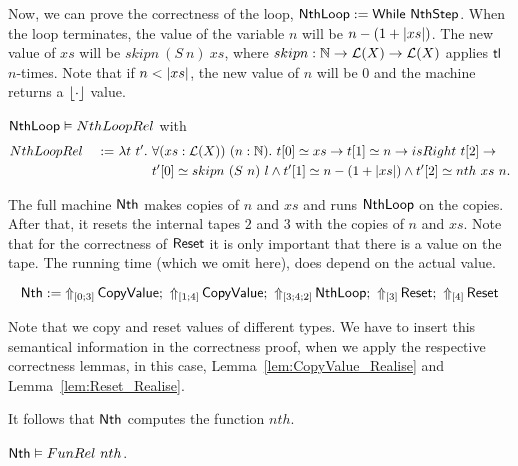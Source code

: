 Now, we can prove the correctness of the loop, $\MS{NthLoop} := \While~\MS{NthStep}$.  When the loop terminates, the value of the variable $n$ will be
$n - (1 + \length{xs})$.  The new value of $xs$ will be $skipn~(S~n)~xs$, where $skipn : \Nat \to \List(X) \to \List(X)$ applies $\tl$ $n$-times.  Note
that if $n < \length{xs}$, the new value of $n$ will be $0$ and the machine returns a $\Some\cdot$ value.

\begin{lemma}
  \label{lem:Nth_Loop_Realise}
  $\MS{NthLoop} \Realise NthLoopRel$ with
  \begin{alignat*}{2}
    & NthLoopRel &~:=~& \lambda t~t'.~\forall (xs:\List(X))~(n:\Nat).~t[0] \simeq xs \rightarrow t[1] \simeq n \rightarrow isRight~t[2] \rightarrow \\
    &            &~  ~& \phantom{\lambda t~t'.}~t'[0] \simeq skipn~(S~n)~l \land t'[1] \simeq n-(1+\length{xs}) \land t'[2] \simeq nth~xs~n.
  \end{alignat*}
\end{lemma}

The full machine $\MS{Nth}$ makes copies of $n$ and $xs$ and runs $\MS{NthLoop}$ on the copies.  After that, it resets the internal tapes $2$ and $3$
with the copies of $n$ and $xs$.  Note that for the correctness of $\MS{Reset}$ it is only important that there is a value on the tape.  The running time
(which we omit here), does depend on the actual value.
\begin{definition}[$\MS{Nth}$][Nth]
  \[
    \MS{Nth} := \LiftTapes{\MS{CopyValue}}{\Vector{0;3}} \Seq
    \LiftTapes{\MS{CopyValue}}{\Vector{1;4}} \Seq
    \LiftTapes{\MS{NthLoop}}{\Vector{3;4;2}} \Seq
    \LiftTapes{\MS{Reset}}{\Vector{3}} \Seq
    \LiftTapes{\MS{Reset}}{\Vector{4}}
  \]
\end{definition}
Note that we copy and reset values of different types.  We have to insert this semantical information in the correctness proof, when we apply the
respective correctness lemmas, in this case, Lemma~\ref{lem:CopyValue_Realise} and Lemma~\ref{lem:Reset_Realise}.

It follows that $\MS{Nth}$ computes the function $nth$.
\begin{lemma}
  \label{lem:Nth_Computes}
  $\MS{Nth} \Realise FunRel~nth$.
\end{lemma}



